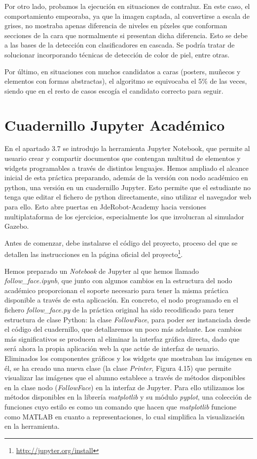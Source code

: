 Por otro lado, probamos la ejecución en situaciones de contraluz. En este caso, el comportamiento empeoraba, ya que la imagen captada, al convertirse a escala de grises, no mostraba apenas diferencia de niveles en píxeles que conforman secciones de la cara que normalmente si presentan dicha diferencia. Esto se debe a las bases de la detección con clasificadores en cascada. Se podría tratar de solucionar incorporando técnicas de detección de color de piel, entre otras.

Por último, en situaciones con muchos candidatos a caras (posters, muñecos y elementos con formas abstractas), el algoritmo se equivocaba el 5\% de las veces, siendo que en el resto de casos escogía el candidato correcto para seguir.

\section{Cuadernillo Jupyter Académico}
En el apartado 3.7 se introdujo la herramienta Jupyter Notebook,  que permite al usuario crear y compartir documentos que contengan multitud de elementos y widgets programables a través de distintos lenguajes. Hemos ampliado el alcance inicial de esta práctica preparando, además de la versión con nodo académico en python, una versión en un cuadernillo Jupyter. Esto permite que el estudiante no tenga que
editar el fichero de python directamente, sino utilizar el navegador web para ello. Esto abre puertas en JdeRobot-Academy hacia versiones multiplataforma de los ejercicios, especialmente los que involucran al simulador Gazebo.

Antes de comenzar, debe instalarse el código del proyecto, proceso del que se detallen las instrucciones en la página oficial del proyecto\footnote{\url{http://jupyter.org/install}}.

Hemos preparado un \textit{Notebook} de Jupyter al que hemos llamado \textit{follow\_face.ipynb}, que junto con algunos cambios en la estructura del nodo académico proporcionan el soporte necesario para tener la misma práctica disponible a través de esta aplicación. En concreto, el nodo programado en el fichero \textit{follow\_face.py} de la práctica original ha sido recodificado para tener estructura de clase Python: la clase \textit{FollowFace}, para poder ser instanciada desde el código del cuadernillo, que detallaremos un poco más adelante. Los cambios más significativos se producen al eliminar la interfaz gráfica directa, dado que será ahora la propia aplicación web la que actúe de interfaz de usuario. Eliminados los componentes gráficos y los widgets que mostraban las imágenes en él, se ha creado una nueva clase (la clase \textit{Printer}, Figura 4.15) que permite visualizar las imágenes que el alumno establece a través de métodos disponibles en la clase nodo (\textit{FollowFace}) en la interfaz de Jupyter. Para ello utilizamos los métodos disponibles en la librería \textit{matplotlib} y su módulo \textit{pyplot},  una colección de funciones cuyo estilo es como un comando que hacen que \textit{matplotlib} funcione como MATLAB en cuanto a representaciones, lo cual simplifica la visualización en la herramienta. 


